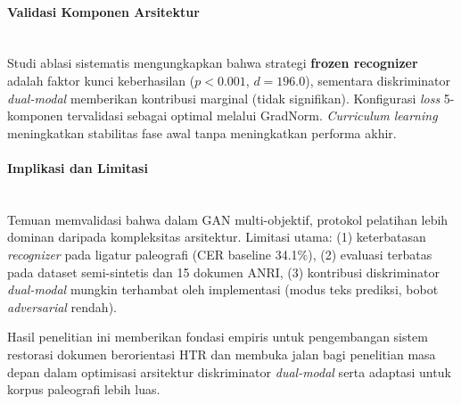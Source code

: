 \documentclass[12pt,a4paper]{article}
\begin{document}
\paragraph{Validasi Komponen Arsitektur} \mbox{}\\[0.1em]
Studi ablasi sistematis mengungkapkan bahwa strategi \textbf{frozen recognizer} adalah faktor kunci keberhasilan ($p<0.001$, $d=196.0$), sementara diskriminator \textit{dual-modal} memberikan kontribusi marginal (tidak signifikan). Konfigurasi \textit{loss} 5-komponen tervalidasi sebagai optimal melalui GradNorm. \textit{Curriculum learning} meningkatkan stabilitas fase awal tanpa meningkatkan performa akhir.

\paragraph{Implikasi dan Limitasi} \mbox{}\\[0.1em]
Temuan memvalidasi bahwa dalam GAN multi-objektif, protokol pelatihan lebih dominan daripada kompleksitas arsitektur. Limitasi utama: (1) keterbatasan \textit{recognizer} pada ligatur paleografi (CER baseline 34.1\%), (2) evaluasi terbatas pada dataset semi-sintetis dan 15 dokumen ANRI, (3) kontribusi diskriminator \textit{dual-modal} mungkin terhambat oleh implementasi (modus teks prediksi, bobot \textit{adversarial} rendah).

Hasil penelitian ini memberikan fondasi empiris untuk pengembangan sistem restorasi dokumen berorientasi HTR dan membuka jalan bagi penelitian masa depan dalam optimisasi arsitektur diskriminator \textit{dual-modal} serta adaptasi untuk korpus paleografi lebih luas.

\end{document}
